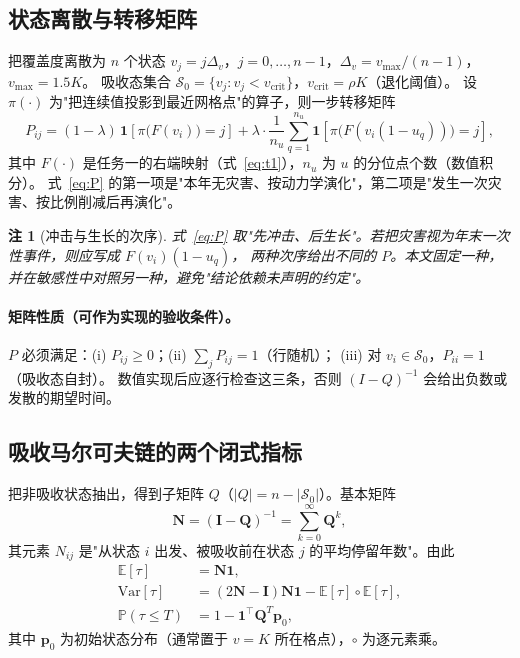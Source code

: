 \documentclass[11pt,a4paper]{ctexart}
\newtheorem{remark}{注}
\newcommand{\E}{\mathbb{E}}
\newcommand{\Prob}{\mathbb{P}}
\newcommand{\ind}[1]{\mathbf{1}\!\left[#1\right]}
\begin{document}
\subsection{状态离散与转移矩阵}

把覆盖度离散为 $n$ 个状态 $v_j=j\Delta_v$，$j=0,\dots,n-1$，$\Delta_v=v_{\max}/(n-1)$，$v_{\max}=1.5K$。
吸收态集合 $\mathcal{S}_0=\{v_j: v_j<v_{\mathrm{crit}}\}$，$v_{\mathrm{crit}}=\rho K$（退化阈值）。
设 $\pi(\cdot)$ 为"把连续值投影到最近网格点"的算子，则一步转移矩阵
\begin{equation}\label{eq:P}
P_{ij}=(1-\lambda)\,\ind{\pi\big(F(v_i)\big)=j}
+\lambda\cdot\frac{1}{n_u}\sum_{q=1}^{n_u}\ind{\pi\big(F(v_i(1-u_q))\big)=j},
\end{equation}
其中 $F(\cdot)$ 是任务一的右端映射（式~\eqref{eq:t1}），$n_u$ 为 $u$ 的分位点个数（数值积分）。
式~\eqref{eq:P} 的第一项是"本年无灾害、按动力学演化"，第二项是"发生一次灾害、按比例削减后再演化"。

\begin{remark}[冲击与生长的次序]
式~\eqref{eq:P} 取"先冲击、后生长"。若把灾害视为年末一次性事件，则应写成 $F(v_i)(1-u_q)$，
两种次序给出不同的 $P$。本文固定一种，并在敏感性中对照另一种，避免"结论依赖未声明的约定"。
\end{remark}

\paragraph{矩阵性质（可作为实现的验收条件）。}
$P$ 必须满足：(i) $P_{ij}\ge0$；(ii) $\sum_jP_{ij}=1$（行随机）；
(iii) 对 $v_i\in\mathcal{S}_0$，$P_{ii}=1$（吸收态自封）。
数值实现后应逐行检查这三条，否则 $(I-Q)^{-1}$ 会给出负数或发散的期望时间。

\subsection{吸收马尔可夫链的两个闭式指标}

把非吸收状态抽出，得到子矩阵 $Q$（$|Q|=n-|\mathcal{S}_0|$）。基本矩阵
\begin{equation}\label{eq:N}
\bm{N}=(\bm{I}-\bm{Q})^{-1}=\sum_{k=0}^{\infty}\bm{Q}^{k},
\end{equation}
其元素 $N_{ij}$ 是"从状态 $i$ 出发、被吸收前在状态 $j$ 的平均停留年数"。由此
\begin{align}
\E[\tau]&=\bm{N}\bm{1}, \label{eq:etime}\\
\mathrm{Var}[\tau]&=(2\bm{N}-\bm{I})\bm{N}\bm{1}-\E[\tau]\circ\E[\tau], \label{eq:var}\\
\Prob(\tau\le T)&=1-\bm{1}^{\top}\bm{Q}^{T}\bm{p}_0, \label{eq:ptau}
\end{align}
其中 $\bm{p}_0$ 为初始状态分布（通常置于 $v=K$ 所在格点），$\circ$ 为逐元素乘。
\end{document}
